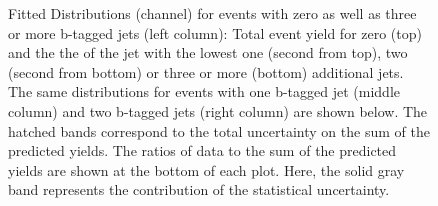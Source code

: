 \begin{figure}[htbp!]
\begin{center}
\caption{Fitted Distributions (\emu channel) for events with zero as well as three or
  more b-tagged jets (left column): Total event yield for zero (top) and the the \pt of the jet with the lowest \pt one (second from top),
  two (second from bottom) or three or more (bottom) additional jets. The same distributions for events with one
  b-tagged jet (middle column) and two b-tagged jets (right column) are
  shown below.   
  The hatched bands correspond to the total uncertainty on the sum of
  the predicted yields. The ratios of data to the sum of the
  predicted yields are shown at the bottom of each plot. Here, the solid
  gray band represents the contribution of the statistical uncertainty.   
       \label{fig:lh_emu_postfitdistr8}}
  \end{center}
\end{figure}

